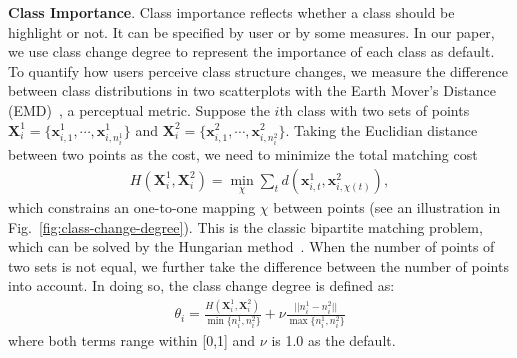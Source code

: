 \vspace{1.5mm}
\noindent\textbf{Class Importance}.
Class importance reflects whether a class should be highlight or not. It can be specified by user or by some measures. In our paper, we use class change degree to represent the importance of each class as default.
To quantify how users perceive class structure changes, we measure the difference between class distributions in two scatterplots with the Earth Mover's Distance (EMD)~\cite{rubner2000earth}, a perceptual metric.
Suppose the $i$th  class with two sets of points $\mathbf{X}^1_i = \{\mathbf{x}_{i,1}^1, \cdots , \mathbf{x}_{i,n^1_i}^1\}$ and $\mathbf{X}^2_i = \{\mathbf{x}_{i,1}^2, \cdots , \mathbf{x}_{i,n^2_i}^2\}$.
Taking the Euclidian distance between two points as the cost, we need to  minimize the total matching cost
\begin{align}\label{eq:emd}
 H(\mathbf{X}^1_i, \mathbf{X}^2_i)  = \min_\chi \sum_t d(\mathbf{x}_{i,t}^1, \mathbf{x}_{i,\chi(t)}^2),
\end{align}
which constrains an one-to-one mapping $\chi$ between points (see an illustration in Fig.~\ref{fig:class-change-degree}). This is the classic bipartite matching problem, which can be solved by the Hungarian method~\cite{kuhn1955hungarian}.
When the number of points of two sets is not equal, we further take the difference between the number of points into account. In doing so, the class change degree is defined as:
\begin{align}\label{eq:cm}
 \theta_i= \frac{H(\mathbf{X}^1_i, \mathbf{X}^2_i) }{\min\{n^1_i, n^2_i\}} + \nu \frac{||n^1_i- n^2_i||}{\max\{n^1_i, n^2_i\}}
\end{align}
where both terms range within [0,1] and $\nu$ is 1.0 as the default.


